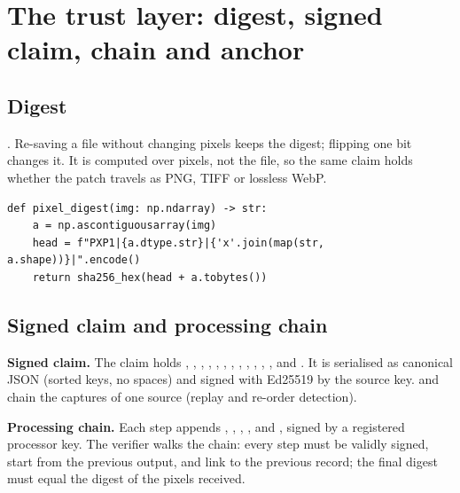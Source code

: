 \section{The trust layer: digest, signed claim, chain and anchor}\label{sec:trust}

\subsection{Digest}
 \cite{fips180}. Re-saving a file without changing pixels keeps the digest; flipping one bit changes it. It is computed over pixels, not the file, so the same claim holds whether the patch travels as PNG, TIFF or lossless WebP.
\begin{lstlisting}[style=py]
def pixel_digest(img: np.ndarray) -> str:
    a = np.ascontiguousarray(img)
    head = f"PXP1|{a.dtype.str}|{'x'.join(map(str, a.shape))}|".encode()
    return sha256_hex(head + a.tobytes())
\end{lstlisting}

\subsection{Signed claim and processing chain}
\textbf{Signed claim.} The claim holds , , , , , , , , , , , ,  and . It is serialised as canonical JSON (sorted keys, no spaces) and signed with Ed25519 \cite{rfc8032,ed25519} by the source key.  and  chain the captures of one source (replay and re-order detection).

\textbf{Processing chain.} Each step appends , , , ,  and , signed by a registered processor key. The verifier walks the chain: every step must be validly signed, start from the previous output, and link to the previous record; the final digest must equal the digest of the pixels received.

